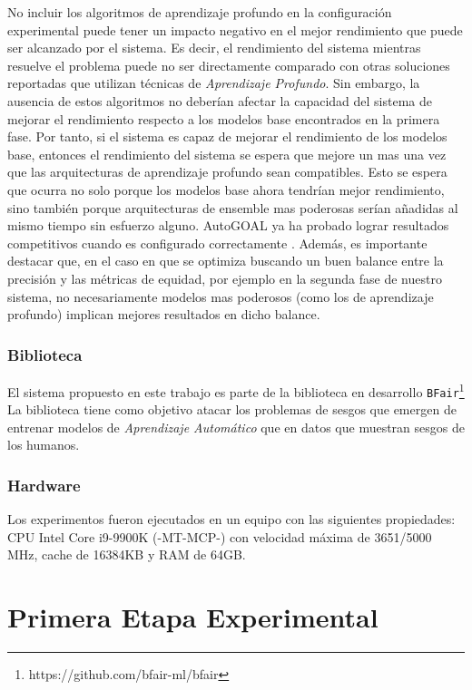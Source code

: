 No incluir los algoritmos de aprendizaje profundo en la configuración experimental puede tener un impacto negativo en el mejor rendimiento que puede ser alcanzado por el sistema.
Es decir, el rendimiento del sistema mientras resuelve el problema puede no ser directamente comparado con otras soluciones reportadas que utilizan técnicas de \emph{Aprendizaje Profundo}.
Sin embargo, la ausencia de estos algoritmos no deberían afectar la capacidad del sistema de mejorar el rendimiento respecto a los modelos base encontrados en la primera fase.
Por tanto, si el sistema es capaz de mejorar el rendimiento de los modelos base, entonces el rendimiento del sistema se espera que mejore un mas una vez que las arquitecturas de aprendizaje profundo sean compatibles.
Esto se espera que ocurra no solo porque los modelos base ahora tendrían mejor rendimiento, sino también porque arquitecturas de ensemble mas poderosas serían añadidas al mismo tiempo sin esfuerzo alguno.
AutoGOAL ya ha probado lograr resultados competitivos cuando es configurado correctamente \parencite{estevez2020automatic}.
Además, es importante destacar que, en el caso en que se optimiza buscando un buen balance entre la precisión y las métricas de equidad, por ejemplo en la segunda fase de nuestro sistema, no necesariamente modelos mas poderosos (como los de aprendizaje profundo) implican mejores resultados en dicho balance.

\subsubsection{Biblioteca}\label{section:library}

El sistema propuesto en este trabajo es parte de la biblioteca en desarrollo \texttt{BFair}\footnote{https://github.com/bfair-ml/bfair}
La biblioteca tiene como objetivo atacar los problemas de sesgos que emergen de entrenar modelos de \emph{Aprendizaje Automático} que en datos que muestran sesgos de los humanos.

\subsubsection{Hardware}\label{section:hardware}

Los experimentos fueron ejecutados en un equipo con las siguientes propiedades:
CPU Intel Core i9-9900K (-MT-MCP-) con velocidad máxima de 3651/5000 MHz, cache de 16384KB y RAM de 64GB.

\section{Primera Etapa Experimental}\label{section:experiments-first-phase}

